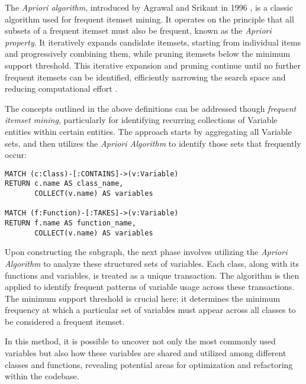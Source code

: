 The \textit{Apriori algorithm}, introduced by Agrawal and Srikant in 1996 \cite{Agrawal_1996}, is a classic algorithm used for frequent itemset mining. It operates on the principle that all subsets of a frequent itemset must also be frequent, known as the \textit{Apriori property}. It iteratively expands candidate itemsets, starting from individual items and progressively combining them, while pruning itemsets below the minimum support threshold. This iterative expansion and pruning continue until no further frequent itemsets can be identified, efficiently narrowing the search space and reducing computational effort \cite{Toivonen_2010}. 

The concepts outlined in the above definitions can be addressed though \textit{frequent itemset mining}, particularly for identifying recurring collections of Variable entities within certain entities. The approach starts by aggregating all Variable sets, and then utilizes the \textit{Apriori Algorithm} to identify those sets that frequently occur:

\begin{verbatim}
MATCH (c:Class)-[:CONTAINS]->(v:Variable)
RETURN c.name AS class_name, 
       COLLECT(v.name) AS variables

MATCH (f:Function)-[:TAKES]->(v:Variable)
RETURN f.name AS function_name, 
       COLLECT(v.name) AS variables
\end{verbatim}

Upon constructing the subgraph, the next phase involves utilizing the \textit{Apriori Algorithm} to analyze these structured sets of variables. Each class, along with its functions and variables, is treated as a unique transaction. The algorithm is then applied to identify frequent patterns of variable usage across these transactions. The minimum support threshold is crucial here; it determines the minimum frequency at which a particular set of variables must appear across all classes to be considered a frequent itemset.

In this method, it is possible to uncover not only the most commonly used variables but also how these variables are shared and utilized among different classes and functions, revealing potential areas for optimization and refactoring within the codebase.

